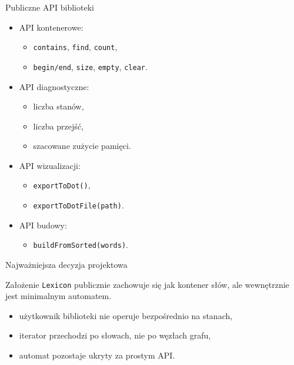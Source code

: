\documentclass{beamer}
\begin{document}
\begin{frame}{Publiczne API biblioteki}
    \begin{itemize}
        \item API kontenerowe:
              \begin{itemize}
                  \item \texttt{contains}, \texttt{find}, \texttt{count},
                  \item \texttt{begin/end}, \texttt{size}, \texttt{empty}, \texttt{clear}.
              \end{itemize}

        \item API diagnostyczne:
              \begin{itemize}
                  \item liczba stanów,
                  \item liczba przejść,
                  \item szacowane zużycie pamięci.
              \end{itemize}

        \item API wizualizacji:
              \begin{itemize}
                  \item \texttt{exportToDot()},
                  \item \texttt{exportToDotFile(path)}.
              \end{itemize}

        \item API budowy:
              \begin{itemize}
                  \item \texttt{buildFromSorted(words)}.
              \end{itemize}
    \end{itemize}
\end{frame}

\begin{frame}{Najważniejsza decyzja projektowa}
    \begin{block}{Założenie}
        \texttt{Lexicon} publicznie zachowuje się jak kontener słów,
        ale wewnętrznie jest minimalnym automatem.
    \end{block}

    \begin{itemize}
        \item użytkownik biblioteki nie operuje bezpośrednio na stanach,
        \item iterator przechodzi po słowach, nie po węzłach grafu,
        \item automat pozostaje ukryty za prostym API.
    \end{itemize}
\end{frame}
\end{document}
